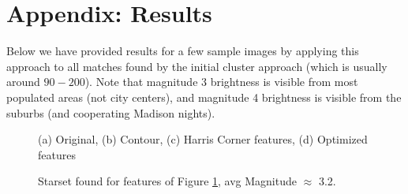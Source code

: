 \documentclass[paper=a4, fontsize=11pt]{scrartcl} %
\begin{document}



\section*{Appendix: Results}
Below we have provided results for a few sample images by applying this approach to all matches found by the initial cluster approach (which is usually around $90-200$). Note that magnitude 3 brightness is visible from most populated areas (not city centers), and magnitude 4 brightness is visible from the suburbs (and cooperating Madison nights). 

\begin{figure}[!h]
\caption{(a) Original, (b) Contour, (c) Harris Corner features, (d) Optimized features}
\label{duck}
\end{figure}

\begin{figure}[!h]
\caption{Starset found for features of Figure \ref{duck}, avg Magnitude $\approx$ 3.2. }
\label{duckstar}
\end{figure}
\end{document}
